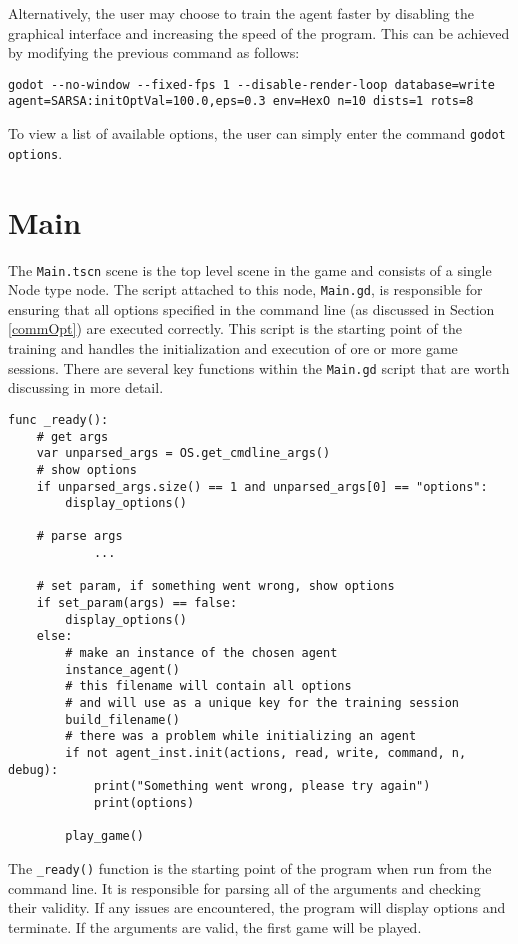 Alternatively, the user may choose to train the agent faster by disabling the graphical interface and increasing the speed of the program. This can be achieved by modifying the previous command as follows:

\begin{lstlisting}
godot --no-window --fixed-fps 1 --disable-render-loop database=write agent=SARSA:initOptVal=100.0,eps=0.3 env=HexO n=10 dists=1 rots=8
\end{lstlisting}

To view a list of available options, the user can simply enter the command \texttt{godot options}.

\section{Main}
The \texttt{Main.tscn} scene is the top level scene in the game and consists of a single Node type node. The script attached to this node, \texttt{Main.gd}, is responsible for ensuring that all options specified in the command line (as discussed in Section \ref{commOpt}) are executed correctly. This script is the starting point of the training and handles the initialization and execution of ore or more game sessions.
There are several key functions within the \texttt{Main.gd} script that are worth discussing in more detail.

\begin{lstlisting}
func _ready():
    # get args
    var unparsed_args = OS.get_cmdline_args()
    # show options
    if unparsed_args.size() == 1 and unparsed_args[0] == "options":
        display_options()
        
    # parse args
    		...
            
    # set param, if something went wrong, show options
    if set_param(args) == false:
        display_options()
    else:
        # make an instance of the chosen agent
        instance_agent()
        # this filename will contain all options 
        # and will use as a unique key for the training session
        build_filename()
        # there was a problem while initializing an agent
        if not agent_inst.init(actions, read, write, command, n, debug):
            print("Something went wrong, please try again")
            print(options)

        play_game()
\end{lstlisting}
The \texttt{\_ready()} function is the starting point of the program when run from the command line. It is responsible for parsing all of the arguments and checking their validity. If any issues are encountered, the program will display options and terminate. If the arguments are valid, the first game will be played. 

